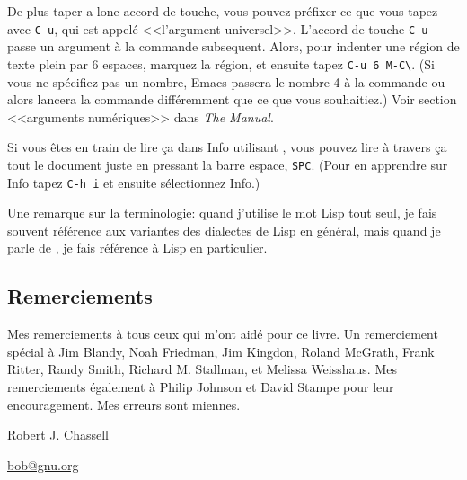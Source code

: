 De plus taper a lone accord de touche, vous pouvez préfixer ce que
vous tapez avec \texttt{C-u}, qui est appelé <<l'argument
universel>>. L'accord de touche \texttt{C-u} passe un argument à la
commande subsequent. Alors, pour indenter une région de texte plein
par 6 espaces, marquez la région, et ensuite tapez \texttt{C-u 6
M-C\textbackslash}. (Si vous ne spécifiez pas un nombre, Emacs passera le nombre 4
à la commande ou alors lancera la commande différemment que ce que
vous souhaitiez.) Voir section <<arguments numériques>> dans
\textit{The \gnue Manual}.

Si vous êtes en train de lire ça dans Info utilisant \gnue , vous
pouvez lire à travers ça tout le document juste en pressant la barre
espace, \texttt{SPC}. (Pour en apprendre sur Info tapez \texttt{C-h i}
et ensuite sélectionnez Info.)

Une remarque sur la terminologie: quand j'utilise le mot Lisp tout
seul, je fais souvent référence aux variantes des dialectes de Lisp en
général, mais quand je parle de \el , je fais référence à \gnue Lisp
en particulier.

\subsection*{Remerciements}

Mes remerciements à tous ceux qui m'ont aidé pour ce livre. Un
remerciement spécial à Jim Blandy, Noah Friedman, Jim Kingdon, Roland
McGrath, Frank Ritter, Randy Smith, Richard M. Stallman, et Melissa
Weisshaus. Mes remerciements également à Philip Johnson et David
Stampe pour leur encouragement. Mes erreurs sont miennes.

\begin{flushright}
Robert J. Chassell

\url{bob@gnu.org}
\end{flushright}